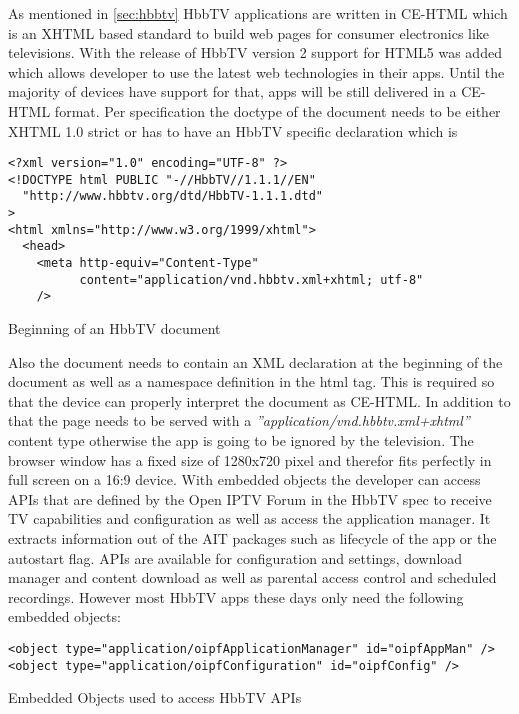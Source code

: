 As mentioned in \ref{sec:hbbtv} HbbTV applications are written in CE-HTML which is an XHTML
based standard to build web pages for consumer electronics like televisions. With the release
of HbbTV version 2 support for HTML5 was added which allows developer to use the latest
web technologies in their apps. Until the majority of devices have support for that, apps will
be still delivered in a CE-HTML format. Per specification the doctype of the document needs
to be either XHTML 1.0 strict or has to have an HbbTV specific declaration which is

\vspace{1cm}
\begin{listing}[H]
\begin{verbatim}
<?xml version="1.0" encoding="UTF-8" ?>
<!DOCTYPE html PUBLIC "-//HbbTV//1.1.1//EN"
  "http://www.hbbtv.org/dtd/HbbTV-1.1.1.dtd"
>
<html xmlns="http://www.w3.org/1999/xhtml">
  <head>
    <meta http-equiv="Content-Type"
          content="application/vnd.hbbtv.xml+xhtml; utf-8"
    />
\end{verbatim}
\caption{Beginning of an HbbTV document}
\label{lst:doctype}
\end{listing}
\vspace{0.5cm}

Also the document needs to contain an XML declaration at the beginning of the document as well
as a namespace definition in the html tag. This is required so that the device can properly
interpret the document as CE-HTML. In addition to that the page needs to be served with a
\textit{''application/vnd.hbbtv.xml+xhtml''} content type otherwise the app is going to be
ignored by the television. The browser window has a fixed size of 1280x720 pixel and therefor
fits perfectly in full screen on a 16:9 device. With embedded objects the developer can access
APIs that are defined by the Open IPTV Forum in the HbbTV spec to receive TV capabilities
and configuration as well as access the application manager. It extracts information out of
the AIT packages such as lifecycle of the app or the autostart flag. APIs are available for
configuration and settings, download manager and content download as well as parental access
control and scheduled recordings. However most HbbTV apps these days only need the following
embedded objects:

\vspace{1cm}
\begin{listing}[H]
\begin{verbatim}
<object type="application/oipfApplicationManager" id="oipfAppMan" />
<object type="application/oipfConfiguration" id="oipfConfig" />
\end{verbatim}
\caption{Embedded Objects used to access HbbTV APIs}
\label{lst:embeddedObjects}
\end{listing}
\vspace{0.5cm}

